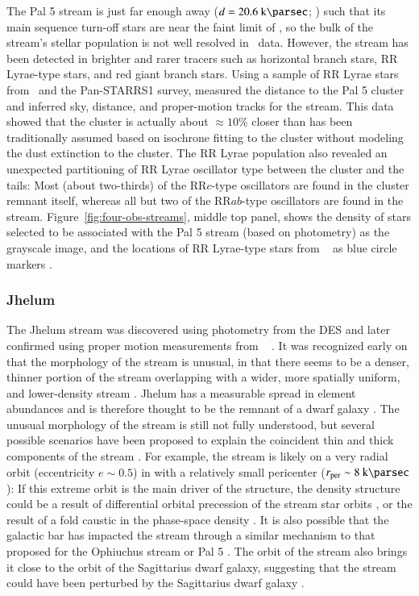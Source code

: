 \documentclass[final,5p,times,twocolumn,authoryear]{elsarticle}
\begin{document}
The Pal 5 stream is just far enough away ($d = 20.6~\kpc$; \citealt{price-whelan:2019})
such that its main sequence turn-off stars are near the faint limit of \gaia, so the
bulk of the stream's stellar population is not well resolved in \gaia\ data.
However, the stream has been detected in brighter and rarer tracers such as horizontal
branch stars, RR Lyrae-type stars, and red giant branch stars.
Using a sample of RR Lyrae stars from \gaia\ and the Pan-STARRS1 survey,
\citet{price-whelan:2019} measured the distance to the Pal 5 cluster and inferred sky,
distance, and proper-motion tracks for the stream.
This data showed that the cluster is actually about $\approx 10\%$ closer than has been
traditionally assumed based on isochrone fitting to the cluster without modeling the
dust extinction to the cluster.
The RR Lyrae population also revealed an unexpected partitioning of RR Lyrae oscillator
type between the cluster and the tails:
Most (about two-thirds) of the RR$c$-type oscillators are found in the cluster remnant
itself, whereas all but two of the RR$ab$-type oscillators are found in the stream.
Figure~\ref{fig:four-obs-streams}, middle top panel, shows the density of stars selected
to be associated with the Pal 5 stream (based on photometry) as the grayscale image, and
the locations of RR Lyrae-type stars from \gaia\  as blue circle markers
\citep{price-whelan:2019}.

\subsubsection{Jhelum}
\label{sec:jhelum}

The Jhelum stream \citep{shipp:2018} was discovered using photometry from the DES and
later confirmed using proper motion measurements from \gaia\  \citep{shipp:2019}.
It was recognized early on that the morphology of the stream is unusual, in that there
seems to be a denser, thinner portion of the stream overlapping with a wider, more
spatially uniform, and lower-density stream \citep{bonaca:2019}.
Jhelum has a measurable spread in element abundances \citep{ji:2020, li:2022} and is
therefore thought to be the remnant of a dwarf galaxy \citep{sheffield:2021}.
The unusual morphology of the stream is still not fully understood, but several possible
scenarios have been proposed to explain the coincident thin and thick components of the
stream \citep[see, e.g., the discussion Section~5 of ][]{bonaca:2019}.
For example, the stream is likely on a very radial orbit (eccentricity $e \sim 0.5$) in
with a relatively small pericenter ($\rper \sim 8~\kpc$): If this extreme orbit is the
main driver of the structure, the density structure could be a result of differential
orbital precession of the stream star orbits \citep{erkal:2016b}, or the result of a
fold caustic in the phase-space density \citep{tremaine:1999}.
It is also possible that the galactic bar has impacted the stream through a similar
mechanism to that proposed for the Ophiuchus stream \citep{price-whelan:2016b} or Pal 5
\citep{pearson:2017}.
The orbit of the stream also brings it close to the orbit of the Sagittarius dwarf
galaxy, suggesting that the stream could have been perturbed by the Sagittarius dwarf
galaxy \citep{woudenberg:2023}.
\end{document}
